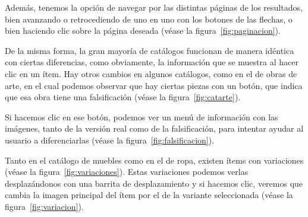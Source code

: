 Además, tenemos la opción de navegar por las distintas páginas de los resultados, bien avanzando o retrocediendo de uno en uno con los botones de las flechas, o bien haciendo clic sobre la página deseada {(v\'ease la figura~\ref{fig:paginacion})}.\\


\clearpage

De la misma forma, la gran mayoría de catálogos funcionan de manera idéntica con ciertas diferencias, como obviamente, la información que se muestra al hacer clic en un ítem. Hay otros cambios en algunos catálogos, como en el de obras de arte, en el cual podemos observar que hay ciertas piezas con un botón, que indica que esa obra tiene una falsificación {(v\'ease la figura~\ref{fig:catarte})}.\\


Si hacemos clic en ese botón, podemos ver un menú de información con las imágenes, tanto de la versión real como de la falsificación, para intentar ayudar al usuario a diferenciarlas {(v\'ease la figura~\ref{fig:falsificacion})}.\\


\clearpage

Tanto en el catálogo de muebles como en el de ropa, existen ítems con variaciones {(v\'ease la figura~\ref{fig:variaciones})}. Estas variaciones podemos verlas desplazándonos con una barrita de desplazamiento y si hacemos clic, veremos que cambia la imagen principal del ítem por el de la variante seleccionada {(v\'ease la figura~\ref{fig:variacion})}.\\

